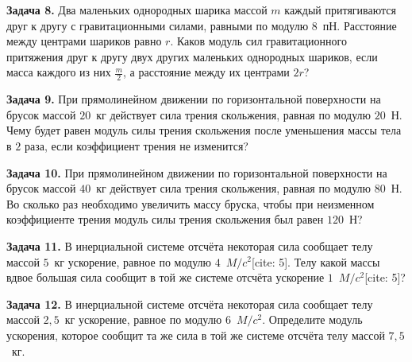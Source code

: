 \begin{taskbasic}[code={\label{task:dem26_v8_n2}}]
\textbf{Задача 8.} Два маленьких однородных шарика массой $m$ каждый притягиваются друг к другу с гравитационными силами, равными по модулю $8$~пН. Расстояние между центрами шариков равно $r$. Каков модуль сил гравитационного притяжения друг к другу двух других маленьких однородных шариков, если масса каждого из них $\frac{m}{2}$, а расстояние между их центрами $2r$?

\end{taskbasic}

\begin{taskbasic}[code={\label{task:dem26_v9_n2}}]
\textbf{Задача 9.} При прямолинейном движении по горизонтальной поверхности на брусок массой $20$~кг действует сила трения скольжения, равная по модулю $20$~Н. Чему будет равен модуль силы трения скольжения после уменьшения массы тела в $2$ раза, если коэффициент трения не изменится?

\end{taskbasic}

\begin{taskbasic}[code={\label{task:dem26_v10_n2}}]
\textbf{Задача 10.} При прямолинейном движении по горизонтальной поверхности на брусок массой $40$~кг действует сила трения скольжения, равная по модулю $80$~Н. Во сколько раз необходимо увеличить массу бруска, чтобы при неизменном коэффициенте трения модуль силы трения скольжения был равен $120$~Н?

\end{taskbasic}

\begin{taskbasic}[code={\label{task:dem26_v11_n2}}]
\textbf{Задача 11.} В инерциальной системе отсчёта некоторая сила сообщает телу массой $5$~кг ускорение, равное по модулю $4$~$M/c^{2}$[cite: 5]. Телу какой массы вдвое большая сила сообщит в той же системе отсчёта ускорение $1$~$M/c^{2}$[cite: 5]?

\end{taskbasic}

\begin{taskbasic}[code={\label{task:dem26_v12_n2}}]
\textbf{Задача 12.} В инерциальной системе отсчёта некоторая сила сообщает телу массой $2{,}5$~кг ускорение, равное по модулю $6$~$M/c^{2}$. Определите модуль ускорения, которое сообщит та же сила в той же системе отсчёта телу массой $7{,}5$~кг.

\end{taskbasic}

